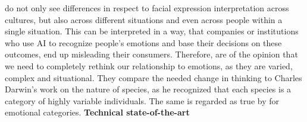 \newline\newline
\citet{Barrett:2019:EmotionalFromFacialMovements} do not only see differences in respect to facial expression interpretation across cultures, but also across different situations and even across people within a single situation. This can be interpreted in a way, that companies or institutions who use AI to recognize people's emotions and base their decisions on these outcomes, end up misleading their consumers. Therefore, \citet{Barrett:2019:EmotionalFromFacialMovements} are of the opinion that we need to completely rethink our relationship to emotions, as they are varied, complex and situational. They compare the needed change in thinking to Charles Darwin's work on the nature of species, as he recognized that each species is a category of highly variable individuals. The same is regarded as true by \citet{Barrett:2019:EmotionalFromFacialMovements} for emotional categories.
\newline\newline\newline
\textbf{Technical state-of-the-art}\newline

